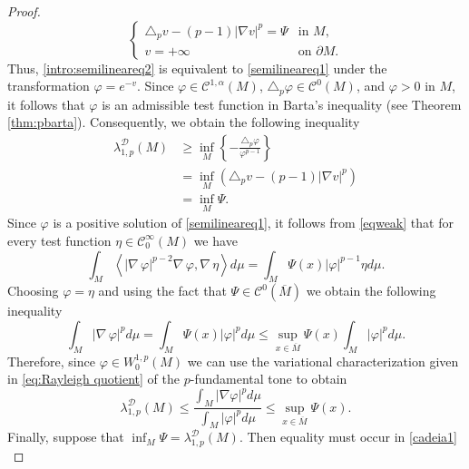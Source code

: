 \documentclass{article}
\newcommand{\grad}{\nabla\,}
\begin{document}
\begin{proof}
\begin{equation}
\begin{cases}
\triangle_p v - (p-1)|\nabla v|^p = \Psi & \text{in } M,\\
v = +\infty & \text{on } \partial M.
\end{cases}
\end{equation}
Thus, \eqref{intro:semilineareq2} is equivalent to \eqref{semilineareq1} under the transformation $\varphi = e^{-v}$. Since $\varphi \in \mathcal{C}^{1,\alpha}(M)$, $\triangle_p \varphi \in \mathcal{C}^{0}(M)$, and $\varphi>0$ in $M$, it follows that $\varphi$ is an admissible test function in Barta's inequality (see Theorem \ref{thm:pbarta}). Consequently, we obtain the following inequality
\begin{equation}\label{cadeia1}
\begin{aligned}
    \lambda_{1,p}^{\mathcal{D}}(M)  &\geq \inf_{M} \left\{ -\frac{\triangle_p \varphi}{\varphi^{p-1}}  \right\} \\
     &= \inf_{M} \left( \triangle_p v - (p-1)| \nabla v |^p \right) \\
    &= \inf_{M} \Psi.
\end{aligned}
\end{equation}
Since $\varphi$ is a positive solution of \eqref{semilineareq1}, it follows from \eqref{eqweak} that for every test function $\eta \in \mathcal{C}_0^{\infty}(M)$ we have
\begin{equation*}
\int_{M} \left\langle |\grad\varphi |^{p-2} \grad \varphi, \grad \eta \right\rangle d\mu =  \int_{M} \Psi(x) | \varphi |^{p-1} \eta d\mu.  
\end{equation*}
Choosing $\varphi = \eta$ and using the fact that $\Psi \in \mathcal{C}^0(\overline{M})$ we obtain the following inequality
\begin{equation*}
\int_{M}  |\grad\varphi |^{p} d\mu =  \int_{M} \Psi(x) | \varphi |^{p} d\mu \leq \sup_{x \in \overline{M}}  \Psi(x) \int_{M}  | \varphi |^{p} d\mu.
\end{equation*}
Therefore, since $\varphi \in W^{1,p}_0(M)$ we can use the variational characterization given in \eqref{eq:Rayleigh quotient} of the $p$-fundamental tone to obtain
\begin{equation}\label{Rayleigh quotient}
    \lambda_{1,p}^{\mathcal{D}}(M)
    \leq \frac{\displaystyle \int_{M} |\nabla \varphi  |^p d\mu} {\displaystyle \int_{M} |\varphi|^p d\mu} \leq \sup_{x \in \overline{M}}  \Psi(x).
\end{equation}
Finally, suppose that $\inf_{M} \Psi = \lambda_{1,p}^{\mathcal{D}}(M)$. Then equality must occur in \eqref{cadeia1}
\begin{equation*}

\end{equation*}
\end{proof}
\end{document}
